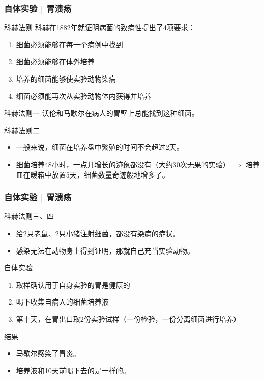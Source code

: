 \begin{frame}
  \frametitle{自体实验 | 胃溃疡}
  \begin{block}{科赫法则}
    科赫在1882年就证明病菌的致病性提出了4项要求：
    \begin{enumerate}
      \item 细菌必须能够在每一个病例中找到
      \item 细菌必须能够在体外培养
      \item 培养的细菌能够使实验动物染病
      \item 细菌必须能再次从实验动物体内获得并培养
    \end{enumerate}
  \end{block}
  \pause
  \begin{block}{科赫法则一}
    沃伦和马歇尔在病人的胃壁上总能找到这种细菌。
  \end{block}
  \pause
  \begin{block}{科赫法则二}
    \begin{itemize}
      \item 一般来说，细菌在培养盘中繁殖的时间不会超过2天。
      \item 细菌培养48小时，一点儿增长的迹象都没有（大约30次无果的实验） $\Longrightarrow$ 培养皿在暖箱中放置5天，细菌数量奇迹般地增多了。
    \end{itemize}
  \end{block}
\end{frame}

\begin{frame}
  \frametitle{自体实验 | 胃溃疡}
  \begin{block}{科赫法则三、四}
    \begin{itemize}
      \item 给2只老鼠、2只小猪注射细菌，都没有染病的症状。
      \item 感染无法在动物身上得到证明，那就自己充当实验动物。
    \end{itemize}
  \end{block}
  \pause
  \begin{block}{自体实验}
    \begin{enumerate}
      \item 取样确认用于自身实验的胃是健康的
      \item 喝下收集自病人的细菌培养液
      \item 第十天，在胃出口取2份实验试样（一份检验，一份分离细菌进行培养）
    \end{enumerate}
  \end{block}
  \pause
  \begin{block}{结果}
    \begin{itemize}
      \item 马歇尔感染了胃炎。
      \item 培养液和10天前喝下去的是一样的。
    \end{itemize}
  \end{block}
\end{frame}


